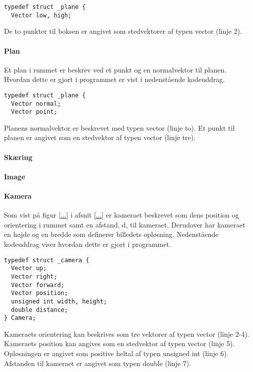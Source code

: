 \begin{lstlisting}[style=Cstyle, caption=Struct til plan]
typedef struct _plane {
  Vector low, high;
\end{lstlisting}

De to punkter til boksen er angivet som stedvektorer af typen vector (linje 2).

\paragraph{Plan}
Et plan i rummet er beskrev ved et punkt og en normalvektor til planen. Hvordan dette er gjort i programmet er vist i nedenstående kodeuddrag. 

\begin{lstlisting}[style=Cstyle, caption=Struct til plan]
typedef struct _plane {
  Vector normal;
  Vector point;
\end{lstlisting}

Planens normalvektor er beskrevet med typen vector (linje to). Et punkt til planen er angivet som en stedvektor af typen vector (linje tre).

\paragraph{Skæring}


\paragraph{Image}

\paragraph{Kamera}
Som vist på figur \ref{...} i afsnit \ref{...} er kameraet beskrevet som dens position og orientering i rummet samt en afstand, d, til kameraet. Derudover har kameraet en højde og en bredde som definerer billedets opløsning. Nedenstående kodeuddrag viser hvordan dette er gjort i programmet.

\begin{lstlisting}[style=Cstyle, caption=Struct til plan]
typedef struct _camera {
  Vector up;
  Vector right;
  Vector forward;
  Vector position;
  unsigned int width, height;
  double distance;
} Camera;
\end{lstlisting}

Kameraets orientering kan beskrives som tre vektorer af typen vector (linje 2-4). Kameraets position kan angives som en stedvektor af typen vector (linje 5). Opløsningen er angivet som positive heltal af typen unsigned int (linje 6). Afstanden til kameraet er angivet som typen double (linje 7).


